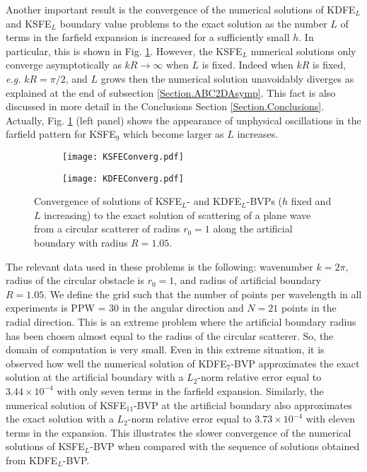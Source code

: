 \documentclass[final,3p,times,12pt]{elsarticle}
\begin{document}
Another important result is the convergence of the numerical solutions of KDFE$_L$ and KSFE$_L$ boundary value problems to the exact solution as the number  $L$ of terms  in the farfield expansion is increased for a sufficiently small $h$. In particular, this is shown in Fig. {\ref{fig:ScattFields}}. However, the KSFE$_L$ numerical solutions only converge asymptotically as $kR \to \infty$ when $L$ is fixed. Indeed when $kR$ is fixed, {\it e.g.} $kR=\pi/2$, and $L$ grows then the numerical solution unavoidably diverges as explained at the end of subsection \ref{Section.ABC2DAsymp}. This fact is also discussed in more detail in the Conclusions  Section \ref{Section.Conclusions}. Actually, Fig. {\ref{fig:ScattFields}} (left panel) shows the appearance of unphysical oscillations in the farfield pattern for KSFE$_{9}$ which become larger as $L$ increases.

\begin{figure}[h!]
\begin{subfigure}{0.5\textwidth}
\texttt{[image: KSFEConverg.pdf]} 
\end{subfigure}
\begin{subfigure}{0.5\textwidth}
\texttt{[image: KDFEConverg.pdf]}
\end{subfigure}
\caption{Convergence of solutions of KSFE$_L$- and KDFE$_L$-BVPs ($h$ fixed and $L$ increasing) to the exact solution of scattering of a plane wave from a circular scatterer of radius $r_0=1$ 
along the artificial boundary with radius $R=1.05.$}
\label{fig:ScattFields}
\end{figure}

The relevant data used in these problems is the following: wavenumber $k=2\pi$, radius of the circular obstacle is $r_0 =1$, and radius of artificial boundary $R=1.05$. We define the grid such that the number of points per wavelength in all experiments is PPW = 30 in the angular direction and $N=21$ points in the radial direction. This is an extreme problem where the artificial boundary radius has been chosen almost equal to the radius of the circular scatterer. So, the domain of computation is very small. Even in this extreme situation, it is observed how well the numerical solution of KDFE$_7$-BVP approximates the exact solution at the artificial boundary with a $L_2$-norm relative error equal to $3.44 \times 10^{-4}$ with only seven terms in the farfield expansion. Similarly, the numerical solution of KSFE$_{11}$-BVP at the artificial boundary also approximates the exact solution with a $L_2$-norm relative error equal to $3.73 \times 10^{-4}$ with eleven terms in the expansion. This illustrates the slower convergence of the numerical solutions of KSFE$_L$-BVP when compared with the sequence of solutions obtained from KDFE$_L$-BVP.
\end{document}
